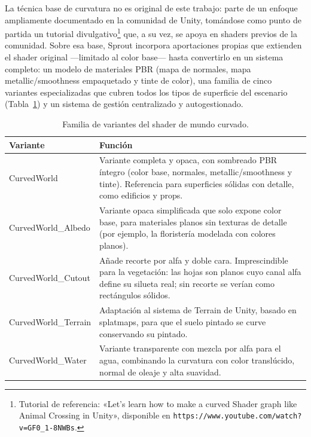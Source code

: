 \documentclass[12pt,twoside,titlepage]{report}
\begin{document}
La técnica base de curvatura no es original de este trabajo: parte de un enfoque ampliamente documentado en la comunidad de Unity, tomándose como punto de partida un tutorial divulgativo\footnote{Tutorial de referencia: «Let's learn how to make a curved Shader graph like Animal Crossing in Unity», disponible en \texttt{https://www.youtube.com/watch?v=GF0\_1-8NWBs}.} que, a su vez, se apoya en shaders previos de la comunidad. Sobre esa base, Sprout incorpora aportaciones propias que extienden el shader original ---limitado al color base--- hasta convertirlo en un sistema completo: un modelo de materiales PBR (mapa de normales, mapa metallic/smoothness empaquetado y tinte de color), una familia de cinco variantes especializadas que cubren todos los tipos de superficie del escenario (Tabla~\ref{tab:variantes_curved}) y un sistema de gestión centralizado y autogestionado.

\begin{table}[h]
  \centering
  \caption{Familia de variantes del shader de mundo curvado.}
  \label{tab:variantes_curved}
  \begin{footnotesize}
  \renewcommand{\arraystretch}{1.3}
  \begin{tabular}{p{3.2cm}p{10cm}}
    \hline
    \textbf{Variante} & \textbf{Función} \\
    \hline
    CurvedWorld & Variante completa y opaca, con sombreado PBR íntegro (color base, normales, metallic/smoothness y tinte). Referencia para superficies sólidas con detalle, como edificios y props. \\
    \hline
    CurvedWorld\_Albedo & Variante opaca simplificada que solo expone color base, para materiales planos sin texturas de detalle (por ejemplo, la floristería modelada con colores planos). \\
    \hline
    CurvedWorld\_Cutout & Añade recorte por alfa y doble cara. Imprescindible para la vegetación: las hojas son planos cuyo canal alfa define su silueta real; sin recorte se verían como rectángulos sólidos. \\
    \hline
    CurvedWorld\_Terrain & Adaptación al sistema de Terrain de Unity, basado en splatmaps, para que el suelo pintado se curve conservando su pintado. \\
    \hline
    CurvedWorld\_Water & Variante transparente con mezcla por alfa para el agua, combinando la curvatura con color translúcido, normal de oleaje y alta suavidad. \\
    \hline
  \end{tabular}
  \end{footnotesize}
\end{table}
\end{document}
